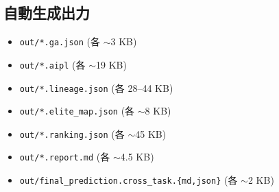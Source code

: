 \documentclass[a4paper,11pt]{article}
\begin{document}
\subsection*{自動生成出力}
\begin{itemize}
  \item \texttt{out/*.ga.json} (各 \(\sim\)3 KB)
  \item \texttt{out/*.aipl} (各 \(\sim\)19 KB)
  \item \texttt{out/*.lineage.json} (各 28--44 KB)
  \item \texttt{out/*.elite\_map.json} (各 \(\sim\)8 KB)
  \item \texttt{out/*.ranking.json} (各 \(\sim\)45 KB)
  \item \texttt{out/*.report.md} (各 \(\sim\)4.5 KB)
  \item \texttt{out/final\_prediction.cross\_task.\{md,json\}} (各 \(\sim\)2 KB)
\end{itemize}
\end{document}
